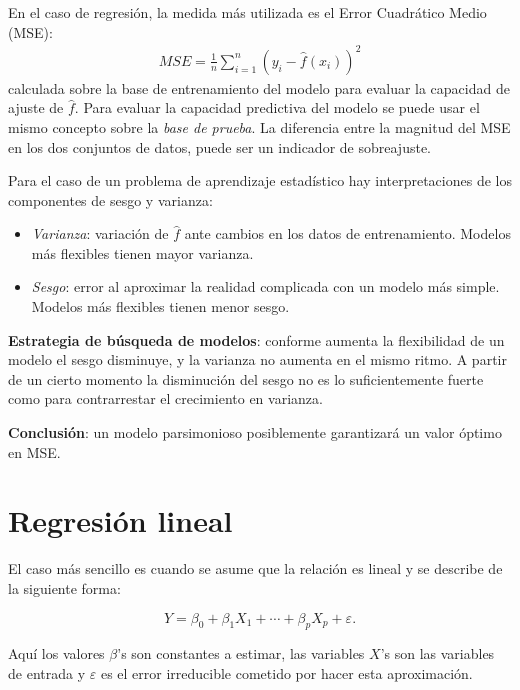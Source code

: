 \documentclass[
  12pt,
]{book}
\providecommand{\tightlist}{%
  \setlength{\itemsep}{0pt}\setlength{\parskip}{0pt}}
\theoremstyle{definition}
\theoremstyle{definition}
\theoremstyle{definition}
\theoremstyle{definition}
\theoremstyle{remark}
\begin{document}
En el caso de regresión, la medida más utilizada es el Error Cuadrático Medio (MSE):
\begin{align*}
MSE=\frac 1 n \sum_{i=1}^n(y_i-\hat f(x_i))^2
\end{align*}
calculada sobre la base de entrenamiento del modelo para evaluar la capacidad de ajuste de \(\hat f\). Para evaluar la capacidad predictiva del modelo se puede usar el mismo concepto sobre la \emph{base de prueba}. La diferencia entre la magnitud del MSE en los dos conjuntos de datos, puede ser un indicador de sobreajuste.

Para el caso de un problema de aprendizaje estadístico hay interpretaciones de los componentes de sesgo y varianza:

\begin{itemize}
\tightlist
\item
  \emph{Varianza}: variación de \(\hat f\) ante cambios en los datos de entrenamiento. Modelos más flexibles tienen mayor varianza.
\item
  \emph{Sesgo}: error al aproximar la realidad complicada con un modelo más simple. Modelos más flexibles tienen menor sesgo.
\end{itemize}

\textbf{Estrategia de búsqueda de modelos}: conforme aumenta la flexibilidad de un modelo el sesgo disminuye, y la varianza no aumenta en el mismo ritmo. A partir de un cierto momento la disminución del sesgo no es lo suficientemente fuerte como para contrarrestar el crecimiento en varianza.

\textbf{Conclusión}: un modelo parsimonioso posiblemente garantizará un valor óptimo en MSE.

\hypertarget{regresiuxf3n-lineal}{%
\section{Regresión lineal}\label{regresiuxf3n-lineal}}

El caso más sencillo es cuando se asume que la relación es lineal y se describe de la siguiente forma:

\begin{equation*}
Y = \beta_{0} + \beta_{1}X_{1} + \cdots +  \beta_{p}X_{p} + \varepsilon.
\end{equation*}

Aquí los valores \(\beta\)'s son constantes a estimar, las variables \(X\)'s son las variables de entrada y \(\varepsilon\) es el error irreducible cometido por hacer esta aproximación.
\end{document}
